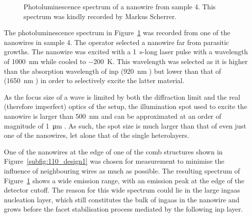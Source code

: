 \begin{figure}
    \centering
    \caption{Photoluminescence spectrum of a nanowire from sample 4. This spectrum was kindly recorded by Markus Scherrer.}
    \label{fig:s4_pl}
\end{figure}

The photoluminescence spectrum in Figure~\ref{fig:s4_pl} was recorded from one of the nanowires in sample 4. The operator selected a nanowire far from parasitic growths. The nanowire was excited with a \qty{1}{\second}-long laser pulse with a wavelength of \qty{1000}{\nano\metre} while cooled to \qty{-200}{\kelvin}. This wavelength was selected as it is higher than the absorption wavelength of \acs{inp} (\qty{920}{\nano\metre} \cite{Bachmann1981}) but lower than that of  (\qty{1650}{\nano\metre} \cite{Takeda1976}) in order to selectively excite the latter material. 

As the focus size of a wave is limited by both the diffraction limit and the real (therefore imperfect) optics of the setup, the illumination spot used to excite the nanowire is larger than \qty{500}{\nano\metre} and can be approximated at an order of magnitude of \qty{1}{\micro\metre} \cite{Scherrer2021}. As such, the spot size is much larger than that of even just one of the nanowires, let alone that of the single heterolayers. 

One of the nanowires at the edge of one of the comb structures shown in Figure~\ref{subfig:110_design1} was chosen for measurement to minimise the influence of neighbouring wires as much as possible. The resulting spectrum of Figure~\ref{fig:s4_pl} shows a wide emission range, with an emission peak at the edge of the detector cutoff. The reason for this wide spectrum could lie in the large \acs{ingaas} nucleation layer, which still constitutes the bulk of \acs{ingaas} in the nanowire and grows before the facet stabilisation process mediated by the following \acs{inp} layer.


